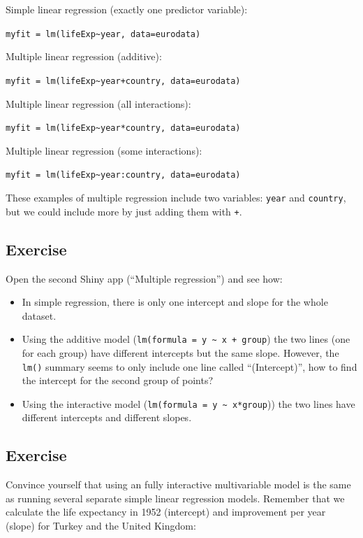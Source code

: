 \documentclass[]{book}
\providecommand{\tightlist}{%
  \setlength{\itemsep}{0pt}\setlength{\parskip}{0pt}}
\begin{document}
Simple linear regression (exactly one predictor variable):

\texttt{myfit\ =\ lm(lifeExp\textasciitilde{}year,\ data=eurodata)}

Multiple linear regression (additive):

\texttt{myfit\ =\ lm(lifeExp\textasciitilde{}year+country,\ data=eurodata)}

Multiple linear regression (all interactions):

\texttt{myfit\ =\ lm(lifeExp\textasciitilde{}year*country,\ data=eurodata)}

Multiple linear regression (some interactions):

\texttt{myfit\ =\ lm(lifeExp\textasciitilde{}year:country,\ data=eurodata)}

These examples of multiple regression include two variables:
\texttt{year} and \texttt{country}, but we could include more by just
adding them with \texttt{+}.

\subsection{Exercise}\label{exercise-38}

Open the second Shiny app (``Multiple regression'') and see how:

\begin{itemize}
\tightlist
\item
  In simple regression, there is only one intercept and slope for the
  whole dataset.
\item
  Using the additive model
  (\texttt{lm(formula\ =\ y\ \textasciitilde{}\ x\ +\ group}) the two
  lines (one for each group) have different intercepts but the same
  slope. However, the \texttt{lm()} summary seems to only include one
  line called ``(Intercept)'', how to find the intercept for the second
  group of points?
\item
  Using the interactive model
  (\texttt{lm(formula\ =\ y\ \textasciitilde{}\ x*group})) the two lines
  have different intercepts and different slopes.
\end{itemize}

\subsection{Exercise}\label{exercise-39}

Convince yourself that using an fully interactive multivariable model is
the same as running several separate simple linear regression models.
Remember that we calculate the life expectancy in 1952 (intercept) and
improvement per year (slope) for Turkey and the United Kingdom:
\end{document}
